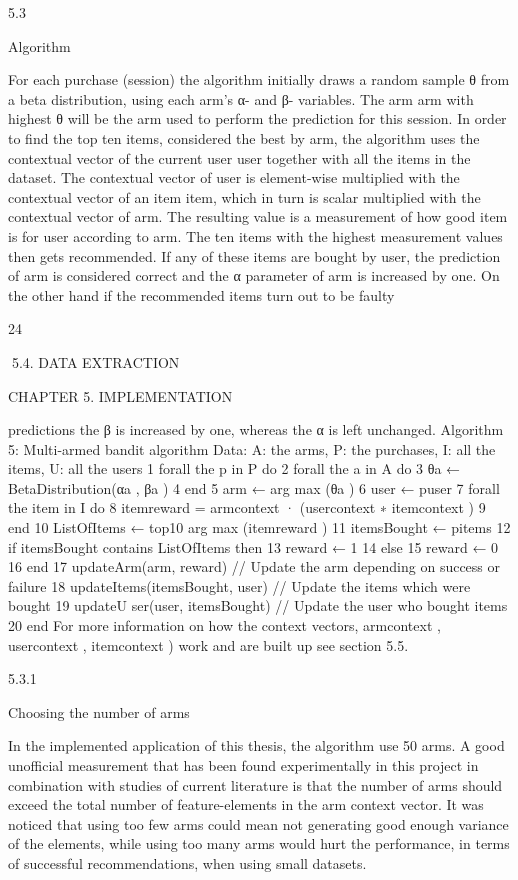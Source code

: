 5.3

Algorithm

For each purchase (session) the algorithm initially draws a random sample θ from a beta
distribution, using each arm’s α- and β- variables. The arm arm with highest θ will
be the arm used to perform the prediction for this session. In order to find the top
ten items, considered the best by arm, the algorithm uses the contextual vector of the
current user user together with all the items in the dataset. The contextual vector of
user is element-wise multiplied with the contextual vector of an item item, which in
turn is scalar multiplied with the contextual vector of arm. The resulting value is a
measurement of how good item is for user according to arm. The ten items with the
highest measurement values then gets recommended. If any of these items are bought
by user, the prediction of arm is considered correct and the α parameter of arm is
increased by one. On the other hand if the recommended items turn out to be faulty

24

5.4. DATA EXTRACTION

CHAPTER 5. IMPLEMENTATION

predictions the β is increased by one, whereas the α is left unchanged.
Algorithm 5: Multi-armed bandit algorithm
Data: A: the arms, P: the purchases, I: all the items, U: all the users
1 forall the p in P do
2
forall the a in A do
3
θa ← BetaDistribution(αa , βa )
4
end
5
arm ← arg max (θa )
6
user ← puser
7
forall the item in I do
8
itemreward = armcontext · (usercontext ∗ itemcontext )
9
end
10
ListOfItems ← top10 arg max (itemreward )
11
itemsBought ← pitems
12
if itemsBought contains ListOfItems then
13
reward ← 1
14
else
15
reward ← 0
16
end
17
updateArm(arm, reward) // Update the arm depending on success or failure
18
updateItems(itemsBought, user) // Update the items which were bought
19
updateU ser(user, itemsBought) // Update the user who bought items
20 end
For more information on how the context vectors, armcontext , usercontext , itemcontext )
work and are built up see section 5.5.

5.3.1

Choosing the number of arms

In the implemented application of this thesis, the algorithm use 50 arms. A good unofficial measurement that has been found experimentally in this project in combination
with studies of current literature is that the number of arms should exceed the total
number of feature-elements in the arm context vector. It was noticed that using too few
arms could mean not generating good enough variance of the elements, while using too
many arms would hurt the performance, in terms of successful recommendations, when
using small datasets.

